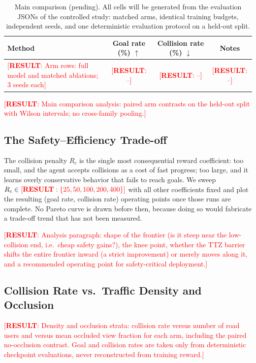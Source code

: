 \documentclass{article}
\newcommand{\results}[1]{\textcolor{red}{[\textbf{RESULT}: #1]}}
\begin{document}
\begin{table}[t]
\centering
\caption{Main comparison (pending). All cells will be generated from the
evaluation JSONs of the controlled study: matched arms, identical training
budgets, independent seeds, and one deterministic evaluation protocol on a
held-out split.}
\label{tab:main}
\begin{tabular}{lccc}
\toprule
Method & Goal rate (\%) $\uparrow$ & Collision rate (\%) $\downarrow$ & Notes \\
\midrule
\results{Arm rows: full model and matched ablations; 3 seeds each} &
\results{--} & \results{--} & \results{--} \\
\bottomrule
\end{tabular}
\end{table}

\results{Main comparison analysis: paired arm contrasts on the held-out
split with Wilson intervals; no cross-family pooling.}

\subsection{The Safety--Efficiency Trade-off}
\label{sec:tradeoff}

The collision penalty $R_c$ is the single most consequential reward
coefficient: too small, and the agent accepts collisions as a cost of fast
progress; too large, and it learns overly conservative behavior that fails
to reach goals. We sweep
$R_c \in \results{\{25, 50, 100, 200, 400\}}$ with all other
coefficients fixed and plot the resulting (goal rate, collision rate)
operating points once those runs are complete. No Pareto curve is drawn
before then, because doing so would fabricate a trade-off trend that has not
been measured.

\results{Analysis paragraph: shape of the frontier (is it steep near the
low-collision end, i.e.\ cheap safety gains?), the knee point, whether the
TTZ barrier shifts the entire frontier inward (a strict improvement) or
merely moves along it, and a recommended operating point for
safety-critical deployment.}

\subsection{Collision Rate vs.\ Traffic Density and Occlusion}
\label{sec:density}

\results{Density and occlusion strata: collision rate versus number of road
users and versus mean occluded view fraction for each arm, including the
paired no-occlusion contrast. Goal and collision rates are taken only from
deterministic checkpoint evaluations, never reconstructed from training
reward.}
\end{document}
